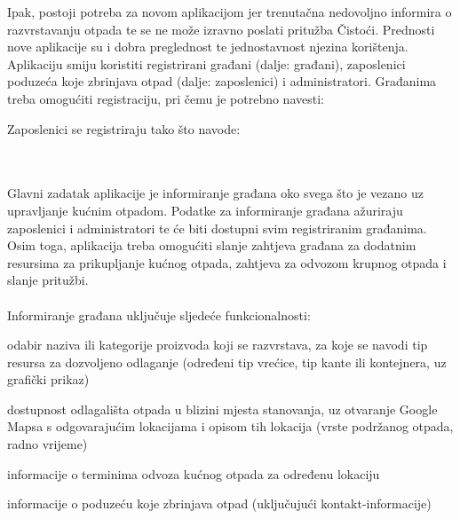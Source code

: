 		
		
		Ipak, postoji potreba za novom aplikacijom jer trenutačna nedovoljno informira o razvrstavanju otpada te se ne može izravno poslati pritužba Čistoći. Prednosti nove aplikacije su i dobra preglednost te jednostavnost njezina korištenja.\\
		
		Aplikaciju smiju koristiti registrirani građani (dalje: građani), zaposlenici poduzeća koje zbrinjava otpad (dalje: zaposlenici) i administratori. Građanima treba omogućiti registraciju, pri čemu je potrebno navesti:
		
		\begin{packed_item}
			\item {}
			\item {}
			\item {}
			\item {}
			\item {}
			\item {}
		\end{packed_item}
		
		\noindent Zaposlenici se registriraju tako što navode:
		
		\begin{packed_item}
			\item \text{korisničko ime}
			\item \text{lozinku}
		\end{packed_item}
	
		\\\\
		
		Glavni zadatak aplikacije je informiranje građana oko svega što je vezano uz upravljanje kućnim otpadom. Podatke za informiranje građana ažuriraju zaposlenici i administratori te će biti dostupni svim registriranim građanima. Osim toga, aplikacija treba omogućiti slanje zahtjeva građana za dodatnim resursima za prikupljanje kućnog otpada, zahtjeva za odvozom krupnog otpada i slanje pritužbi.\\\\
		
		\noindent Informiranje građana uključuje sljedeće funkcionalnosti:
		
		\begin{packed_enum}
			\item odabir naziva ili kategorije proizvoda koji se razvrstava, za koje se navodi tip resursa za dozvoljeno odlaganje (određeni tip vrećice, tip kante ili kontejnera, uz grafički prikaz)
			\item dostupnost odlagališta otpada u blizini mjesta stanovanja, uz otvaranje Google Mapsa s odgovarajućim lokacijama i opisom tih lokacija (vrste podržanog otpada, radno vrijeme)
			\item informacije o terminima odvoza kućnog otpada za određenu lokaciju
			\item informacije o poduzeću koje zbrinjava otpad (uključujući kontakt-informacije)
		\end{packed_enum}
		\text{}
	
